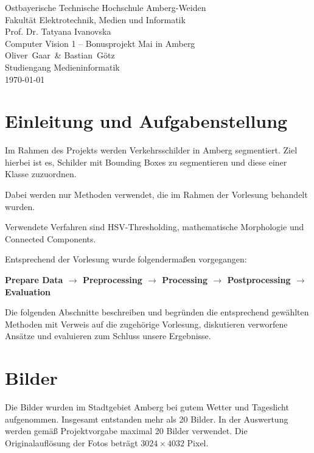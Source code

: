 \documentclass[12pt,oneside]{article}
\newcommand*{\IhrVornameEins}{Oliver}
\newcommand*{\IhrNachnameEins}{Gaar}
\newcommand*{\IhrVornameZwei}{Bastian}
\newcommand*{\IhrNachnameZwei}{Götz}
\newcommand*{\IhrStudiengang}{Medieninformatik}
\newcommand*{\IhreArbeit}{Computer Vision 1 -- Bonusprojekt \glqq Mai in Amberg\grqq}
\newcommand*{\IhrErstpruefer}{Prof. Dr. Tatyana Ivanovska}
\begin{document}
\thispagestyle{empty}

\begin{center}
  \Large
  Ostbayerische Technische Hochschule Amberg-Weiden\\
  Fakultät Elektrotechnik, Medien und Informatik\\[.8cm]
  \IhrErstpruefer\\[.8cm]
  \Large \IhreArbeit\\[.8cm]
  \large \IhrVornameEins\ \IhrNachnameEins\ \&
  \IhrVornameZwei\ \IhrNachnameZwei\\[.8cm]
  \large Studiengang \IhrStudiengang\\[.8cm]
  \today\\[2.0cm]
\end{center}

\tableofcontents
\clearpage

\section{Einleitung und Aufgabenstellung}

Im Rahmen des Projekts werden Verkehrsschilder in Amberg segmentiert. Ziel hierbei ist es, Schilder mit Bounding Boxes zu segmentieren und diese einer Klasse zuzuordnen.

Dabei werden nur Methoden verwendet, die im Rahmen der Vorlesung behandelt wurden.

Verwendete Verfahren sind HSV-Thresholding, mathematische Morphologie und Connected Components.

Entsprechend der Vorlesung wurde folgendermaßen vorgegangen:

\begin{center}
\textbf{Prepare Data $\rightarrow$ Preprocessing $\rightarrow$ Processing $\rightarrow$ Postprocessing $\rightarrow$ Evaluation}
\end{center}

Die folgenden Abschnitte beschreiben und begründen die entsprechend gewählten Methoden mit Verweis auf die zugehörige Vorlesung, diskutieren verworfene Ansätze und evaluieren zum Schluss unsere Ergebnisse.

\section{Bilder}

Die Bilder wurden im Stadtgebiet Amberg bei gutem Wetter und Tageslicht aufgenommen. Insgesamt entstanden mehr als 20 Bilder. In der Auswertung werden gemäß Projektvorgabe maximal 20 Bilder verwendet. Die Originalauflösung der Fotos beträgt $3024 \times 4032$ Pixel.
\end{document}
